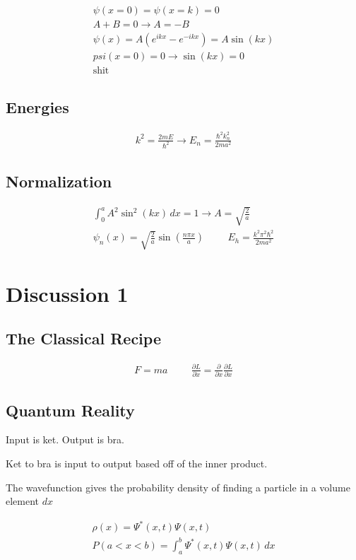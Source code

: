 \documentclass[fleqn]{report}
\newcommand{\hp}{\hspace{1cm}}
\newcommand{\del}{\partial}
\newcommand{\equations} [1] {
\begin{gather*}
#1
\end{gather*}
}
\begin{document}
\equations{
    \psi(x=0)
    =
    \psi(x=k)
    =
    0
    \\
    A 
    + 
    B 
    = 
    0
    \rightarrow 
    A 
    =
    -B
    \\
    \psi(x)
    =
    A(e^{ikx} - e^{-ikx})
    =
    A \sin(kx)
    \\
    psi(x=0) = 0 
    \rightarrow 
    \sin(kx) = 0
    \\
    \textrm{shit}
}

\subsection{Energies}

\equations{
    k^2 
    =
    \frac{2mE}{\hbar^2}
    \rightarrow 
    E_n 
    =
    \frac{\hbar^2 k_n^2}{2ma^2}
}

\subsection{Normalization}
\equations{
    \int_0^{a}
    A^2 \sin^2(kx)
    \, dx 
    =
    1
    \rightarrow 
    A 
    =
    \sqrt{\frac{2}{a}}
    \\
    \psi_n(x)
    =
    \sqrt{\frac{2}{a}}
    \sin(\frac{n \pi x}{a})
    \hp
    E_h 
    =
    \frac{k^2 \pi^2 \hbar^2}{2ma^2}
}

\section{Discussion 1}
\subsection{The Classical Recipe}
\equations{
    F = ma 
    \hp 
    \frac{\del L}{\del \dot x}
    =
    \frac{\del}{\del x}
    \frac{\del L}{\del x}
}

\subsection{Quantum Reality}

Input is ket. Output is bra.

Ket to bra is input to output based off of the inner product. 

The wavefunction gives the probability density of finding a particle 
in a volume element $dx$

\equations{
    \rho(x)
    =
    \Psi^*(x, t) 
    \Psi(x, t) 
    \\
    P(a < x < b)
    =
    \int^b_a
    \Psi^*(x, t) 
    \Psi(x, t) 
    \, dx
}
\end{document}
